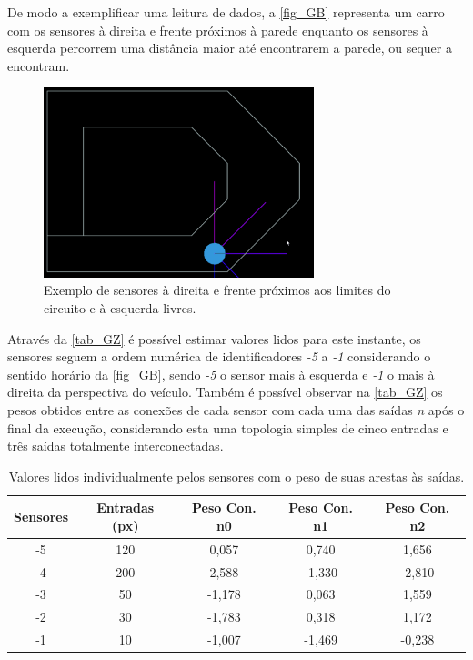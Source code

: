 De modo a exemplificar uma leitura de dados, a \autoref{fig_GB} representa um carro com os sensores à direita
e frente próximos à parede enquanto os sensores à esquerda percorrem uma distância maior até encontrarem a parede,
ou sequer a encontram.

\begin{figure}[htb]
        \centering
        \caption{\label{fig_GB}Exemplo de sensores à direita e frente próximos aos limites do circuito e à esquerda livres.}
        \includegraphics[width=0.7\textwidth]{images/GB.png}
\end{figure}

Através da \autoref{tab_GZ} é possível estimar valores lidos para este instante, os sensores seguem a
ordem numérica de identificadores \textit{-5} a \textit{-1} considerando o sentido horário da \autoref{fig_GB}, sendo \textit{-5} o sensor
mais à esquerda e \textit{-1} o mais à direita da perspectiva do veículo. Também é possível observar na \autoref{tab_GZ}
os pesos obtidos entre as conexões de cada sensor com cada uma das saídas \textit{n} após o final da execução, considerando
esta uma topologia simples de cinco entradas e três saídas totalmente interconectadas.

\begin{table}[htb]
	\centering
    \caption{\label{tab_GZ}Valores lidos individualmente pelos sensores com o peso de suas arestas às saídas.}
    \begin{tabular}{ccccc}
        \hline
		\textbf{Sensores} & \textbf{Entradas (px)} & \textbf{Peso Con. n0} & \textbf{Peso Con. n1} & \textbf{Peso Con. n2} \\ \hline
		-5 & 120  & 0,057   & 0,740  & 1,656   \\ \hline
		-4 & 200  & 2,588   & -1,330  & -2,810   \\ \hline
		-3 & 50  & -1,178   & 0,063  & 1,559   \\ \hline
		-2 & 30  & -1,783   & 0,318  & 1,172  \\ \hline
		-1 & 10  & -1,007   & -1,469  & -0,238   \\ \hline
    \end{tabular}
\end{table}

